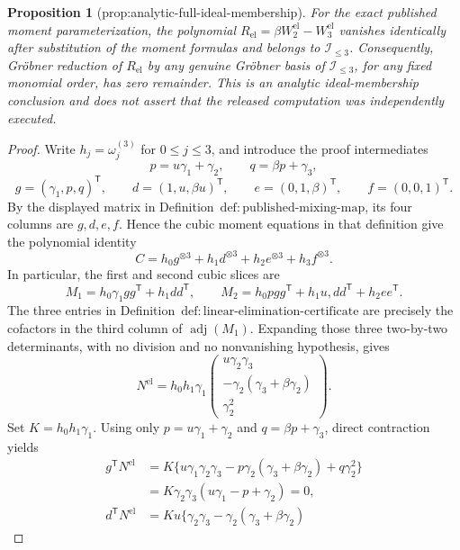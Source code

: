 \documentclass{article}
\newtheorem{proposition}{Proposition}
\begin{document}
\begin{proposition}[prop:analytic-full-ideal-membership]\label{prop:analytic-full-ideal-membership}
For the exact published moment parameterization, the polynomial \(R_{\mathrm{el}}=\beta W_2^{\mathrm{el}}-W_3^{\mathrm{el}}\) vanishes identically after substitution of the moment formulas and belongs to \(\mathcal I_{\leq3}\). Consequently, Gröbner reduction of \(R_{\mathrm{el}}\) by any genuine Gröbner basis of \(\mathcal I_{\leq3}\), for any fixed monomial order, has zero remainder. This is an analytic ideal-membership conclusion and does not assert that the released computation was independently executed.
\end{proposition}
\begin{proof}
Write \(h_j=\omega_j^{(3)}\) for \(0\leq j\leq3\), and introduce the proof intermediates
\[
p=u\gamma _1+\gamma _2,\qquad q=\beta p+\gamma _3,
\]
\[
g=(\gamma _1,p,q)^{\mathsf T},\qquad
d=(1,u,\beta u)^{\mathsf T},\qquad
e=(0,1,\beta)^{\mathsf T},\qquad
f=(0,0,1)^{\mathsf T}.
\]
By the displayed matrix in Definition~\(\mathrm{def{:}published\text{-}mixing\text{-}map}\), its four columns are \(g,d,e,f\).  Hence the cubic moment equations in that definition give the polynomial identity
\[
C=h_0g^{\otimes3}+h_1d^{\otimes3}+h_2e^{\otimes3}+h_3f^{\otimes3}.
\]
In particular, the first and second cubic slices are
\[
M_1=h_0\gamma _1gg^{\mathsf T}+h_1dd^{\mathsf T},
\qquad
M_2=h_0pgg^{\mathsf T}+h_1u,dd^{\mathsf T}+h_2ee^{\mathsf T}.
\]
The three entries in Definition~\(\mathrm{def{:}linear\text{-}elimination\text{-}certificate}\) are precisely the cofactors in the third column of \(\operatorname{adj}(M_1)\).  Expanding those three two-by-two determinants, with no division and no nonvanishing hypothesis, gives
\[
N^{\mathrm{el}}
=h_0h_1\gamma _1
\begin{pmatrix}
u\gamma _2\gamma _3\\
-\gamma _2(\gamma _3+\beta\gamma _2)\\
\gamma _2^2
\end{pmatrix}.
\]
Set \(K=h_0h_1\gamma _1\).  Using only \(p=u\gamma _1+\gamma _2\) and \(q=\beta p+\gamma _3\), direct contraction yields
\[
\begin{aligned}
g^{\mathsf T}N^{\mathrm{el}}
&=K\{u\gamma _1\gamma _2\gamma _3
-p\gamma _2(\gamma _3+\beta\gamma _2)+q\gamma _2^2\}\\
&=K\gamma _2\gamma _3(u\gamma _1-p+\gamma _2)=0,\\
d^{\mathsf T}N^{\mathrm{el}}
&=Ku\{\gamma _2\gamma _3-\gamma _2(\gamma _3+\beta\gamma _2)

\end{aligned}\]
\end{proof}
\end{document}
